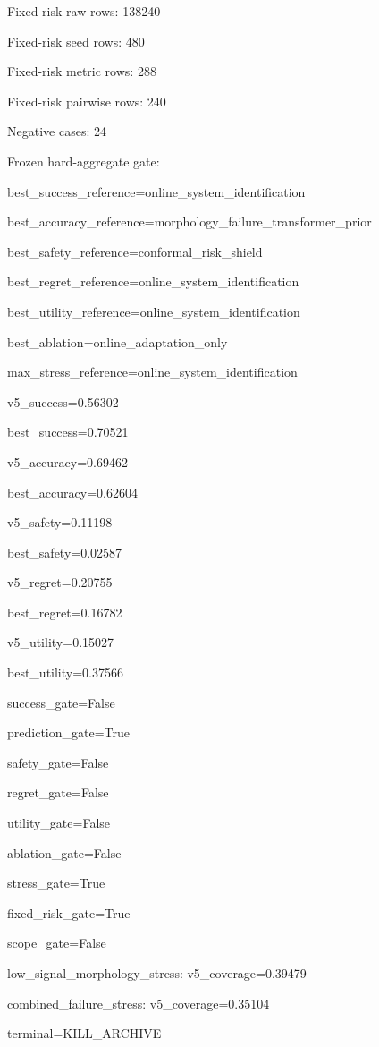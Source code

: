 \documentclass{article}
\begin{document}
\noindent Fixed-risk raw rows: 138240\par
\noindent Fixed-risk seed rows: 480\par
\noindent Fixed-risk metric rows: 288\par
\noindent Fixed-risk pairwise rows: 240\par
\noindent Negative cases: 24\par
\noindent \par
\noindent Frozen hard-aggregate gate:\par
\noindent best\_success\_reference=online\_system\_identification\par
\noindent best\_accuracy\_reference=morphology\_failure\_transformer\_prior\par
\noindent best\_safety\_reference=conformal\_risk\_shield\par
\noindent best\_regret\_reference=online\_system\_identification\par
\noindent best\_utility\_reference=online\_system\_identification\par
\noindent best\_ablation=online\_adaptation\_only\par
\noindent max\_stress\_reference=online\_system\_identification\par
\noindent v5\_success=0.56302\par
\noindent best\_success=0.70521\par
\noindent v5\_accuracy=0.69462\par
\noindent best\_accuracy=0.62604\par
\noindent v5\_safety=0.11198\par
\noindent best\_safety=0.02587\par
\noindent v5\_regret=0.20755\par
\noindent best\_regret=0.16782\par
\noindent v5\_utility=0.15027\par
\noindent best\_utility=0.37566\par
\noindent success\_gate=False\par
\noindent prediction\_gate=True\par
\noindent safety\_gate=False\par
\noindent regret\_gate=False\par
\noindent utility\_gate=False\par
\noindent ablation\_gate=False\par
\noindent stress\_gate=True\par
\noindent fixed\_risk\_gate=True\par
\noindent scope\_gate=False\par
\noindent low\_signal\_morphology\_stress: v5\_coverage=0.39479\par
\noindent combined\_failure\_stress: v5\_coverage=0.35104\par
\noindent terminal=KILL\_ARCHIVE\par
\endgroup
\end{document}
